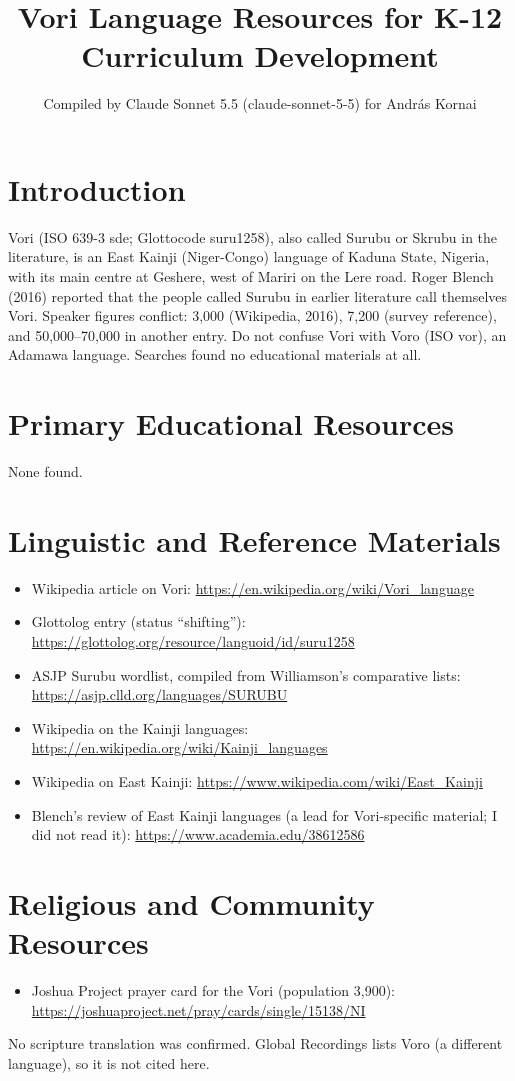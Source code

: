 \documentclass[12pt]{article}
\title{Vori Language Resources for K-12 Curriculum Development}
\author{Compiled by Claude Sonnet 5.5 (claude-sonnet-5-5) for Andr\'as Kornai}
\date{}
\begin{document}
\maketitle

\section{Introduction}
Vori (ISO 639-3 sde; Glottocode suru1258), also called Surubu or Skrubu in the literature, is an East Kainji (Niger-Congo) language of Kaduna State, Nigeria, with its main centre at Geshere, west of Mariri on the Lere road. Roger Blench (2016) reported that the people called Surubu in earlier literature call themselves Vori. Speaker figures conflict: 3,000 (Wikipedia, 2016), 7,200 (survey reference), and 50,000--70,000 in another entry. Do not confuse Vori with Voro (ISO vor), an Adamawa language. Searches found no educational materials at all.

\section{Primary Educational Resources}
None found.

\section{Linguistic and Reference Materials}
\begin{itemize}
\item Wikipedia article on Vori: \url{https://en.wikipedia.org/wiki/Vori_language}
\item Glottolog entry (status ``shifting''): \url{https://glottolog.org/resource/languoid/id/suru1258}
\item ASJP Surubu wordlist, compiled from Williamson's comparative lists: \url{https://asjp.clld.org/languages/SURUBU}
\item Wikipedia on the Kainji languages: \url{https://en.wikipedia.org/wiki/Kainji_languages}
\item Wikipedia on East Kainji: \url{https://www.wikipedia.com/wiki/East_Kainji}
\item Blench's review of East Kainji languages (a lead for Vori-specific material; I did not read it): \url{https://www.academia.edu/38612586}
\end{itemize}

\section{Religious and Community Resources}
\begin{itemize}
\item Joshua Project prayer card for the Vori (population 3,900): \url{https://joshuaproject.net/pray/cards/single/15138/NI}
\end{itemize}
No scripture translation was confirmed. Global Recordings lists Voro (a different language), so it is not cited here.
\end{document}
